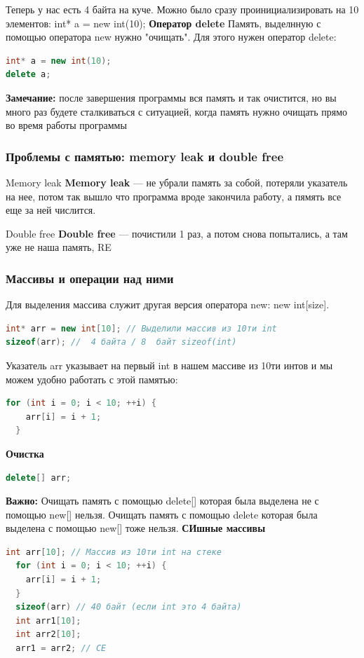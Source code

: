 Теперь у нас есть 4 байта на куче. Можно было сразу проинициализировать на 10 элементов:
int* a = new int(10);
\newline
\textbf{Оператор delete}
Память, выделнную с помощью оператора new нужно "очищать". Для этого нужен оператор delete:
\begin{lstlisting}[language=C++]
int* a = new int(10);
delete a;
\end{lstlisting}
\textbf{Замечание: }после завершения программы вся память и так очистится, но вы много раз будете сталкиваться с ситуацией, когда память нужно очищать прямо во время работы программы

\subsubsection{Проблемы с памятью: memory leak и double free}
\begin{definition}{Memory leak}{}
\textbf{Memory leak} --- не убрали память за собой, потеряли указатель на нее, потом так вышло что программа вроде закончила работу, а пямять все еще за ней числится.
\end{definition}
\begin{definition}
{Double free}{}
\textbf{Double free} --- почистили 1 раз, а потом снова попытались, а там уже не наша память, RE
\end{definition}
\subsubsection{Массивы и операции над ними}
Для выделения массива служит другая версия оператора new: new int[size].
\begin{lstlisting}[language=C++]
int* arr = new int[10]; // Выделили массив из 10ти int
sizeof(arr); //  4 байта / 8  байт sizeof(int)
\end{lstlisting}
Указатель arr указывает на первый int в нашем массиве из 10ти интов и мы можем удобно работать с этой памятью:
\begin{lstlisting}[language=C++]
  for (int i = 0; i < 10; ++i) {
    arr[i] = i + 1;
  }
\end{lstlisting}
\textbf{Очистка}
\begin{lstlisting}[language=C++]
  delete[] arr;
\end{lstlisting}
\textbf{Важно:} Очищать память с помощью delete[] которая была выделена не с помощью new[] нельзя. Очищать память с помощью delete которая была выделена с помощью new[] тоже нельзя.
\textbf{СИшные массивы}
\begin{lstlisting}[language=C++]
  int arr[10]; // Массив из 10ти int на стеке
  for (int i = 0; i < 10; ++i) {
    arr[i] = i + 1;
  }
  sizeof(arr) // 40 байт (если int это 4 байта)
  int arr1[10];
  int arr2[10];
  arr1 = arr2; // CE
\end{lstlisting}
\newpage
